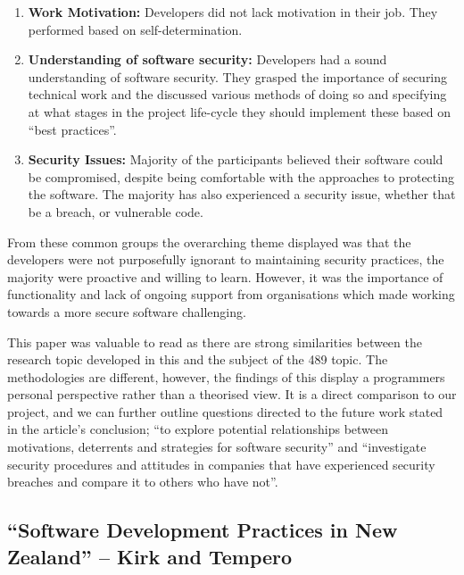 \begin{enumerate}
\item \textbf{Work Motivation:} Developers did not lack motivation in their job. They performed based on self-determination.
\item \textbf{Understanding of software security:} Developers had a sound understanding of software security. They grasped the importance of securing technical work and the discussed various methods of doing so and specifying at what stages in the project life-cycle they should implement these based on “best practices”.
\item \textbf{Security Issues:} Majority of the participants believed their software could be compromised, despite being comfortable with the approaches to protecting the software. The majority has also experienced a security issue, whether that be a breach, or vulnerable code.
\end{enumerate}

\par From these common groups the overarching theme displayed was that the developers were not purposefully ignorant to maintaining security practices, the majority were proactive and willing to learn. However, it was the importance of functionality and lack of ongoing support from organisations which made working towards a more secure software challenging. 
\newline
\par This paper was valuable to read as there are strong similarities between the research topic developed in this and the subject of the 489 topic. The methodologies are different, however, the findings of this display a programmers personal perspective rather than a theorised view. It is a direct comparison to our project, and we can further outline questions directed to the future work stated in the article's conclusion; “to explore potential relationships between motivations, deterrents and strategies for software security” and “investigate security procedures and attitudes in companies that have experienced security breaches and compare it to others who have not”.
\newpage
\subsection{“Software Development Practices in New Zealand” – Kirk and Tempero}

